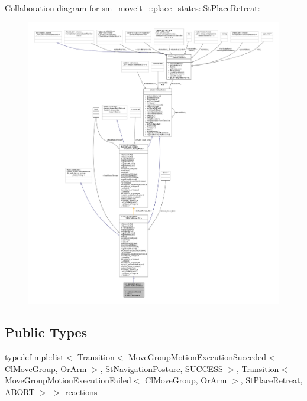 Collaboration diagram for sm\+\_\+moveit\+\_\+:\+:place\+\_\+states\+:\+:St\+Place\+Retreat\+:
\nopagebreak
\begin{figure}[H]
\begin{center}
\leavevmode
\includegraphics[width=350pt]{structsm__moveit__4_1_1place__states_1_1StPlaceRetreat__coll__graph}
\end{center}
\end{figure}
\subsection*{Public Types}
\begin{DoxyCompactItemize}
\item 
typedef mpl\+::list$<$ Transition$<$ \hyperlink{structmoveit__z__client_1_1MoveGroupMotionExecutionSucceded}{Move\+Group\+Motion\+Execution\+Succeded}$<$ \hyperlink{classmoveit__z__client_1_1ClMoveGroup}{Cl\+Move\+Group}, \hyperlink{classsm__moveit__4_1_1OrArm}{Or\+Arm} $>$, \hyperlink{structsm__moveit__4_1_1place__states_1_1StNavigationPosture}{St\+Navigation\+Posture}, \hyperlink{classSUCCESS}{S\+U\+C\+C\+E\+SS} $>$, Transition$<$ \hyperlink{structmoveit__z__client_1_1MoveGroupMotionExecutionFailed}{Move\+Group\+Motion\+Execution\+Failed}$<$ \hyperlink{classmoveit__z__client_1_1ClMoveGroup}{Cl\+Move\+Group}, \hyperlink{classsm__moveit__4_1_1OrArm}{Or\+Arm} $>$, \hyperlink{structsm__moveit__4_1_1place__states_1_1StPlaceRetreat}{St\+Place\+Retreat}, \hyperlink{classABORT}{A\+B\+O\+RT} $>$ $>$ \hyperlink{structsm__moveit__4_1_1place__states_1_1StPlaceRetreat_a137af34354b6135e95217e02aefcc456}{reactions}
\end{DoxyCompactItemize}
